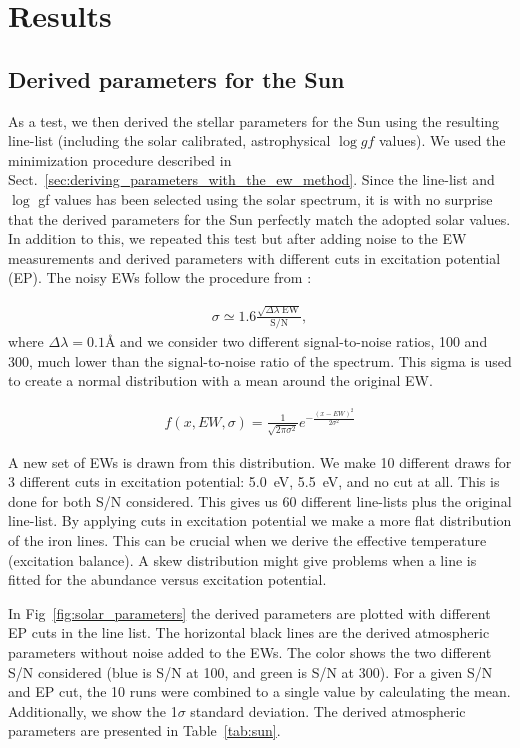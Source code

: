 \documentclass{aa}
\begin{document}
\section{Results}
\label{sec:results}


\subsection{Derived parameters for the Sun}
\label{sec:derived_parameters_of_the_sun}

As a test, we then derived the stellar parameters for the Sun using
the resulting line-list (including the solar calibrated, astrophysical
$\log \mathit{gf}$ values). We used the minimization procedure described
in Sect.~\ref{sec:deriving_parameters_with_the_ew_method}. Since the
line-list and $\log$ gf values has been selected using the solar
spectrum, it is with no surprise that the derived parameters for the
Sun perfectly match the adopted solar values. In addition to this, we
repeated this test but after adding noise to the EW measurements and
derived parameters with different cuts in excitation potential (EP). The
noisy EWs follow the procedure from \cite{Caryel1988}:

\begin{align}
    \sigma \simeq 1.6 \frac{\sqrt{\Delta\lambda\; \mathrm{EW}}}{\mathrm{S/N}},
\end{align}
where $\Delta\lambda=0.1\si{\angstrom}$ and we consider two different
signal-to-noise ratios, 100 and 300, much lower than the signal-to-noise
ratio of the spectrum. This sigma is used to create a normal
distribution with a mean around the original EW.

\begin{align}
    f(x, EW, \sigma) = \frac{1}{\sqrt{2\pi\sigma^2}} e^{-\frac{(x-EW)^2}{2\sigma^2}}
\end{align}

A new set of EWs is drawn from this distribution. We make 10 different
draws for 3 different cuts in excitation potential: \SI{5.0}{eV},
\SI{5.5}{eV}, and no cut at all. This is done for both S/N considered.
This gives us 60 different line-lists plus the original line-list. By
applying cuts in excitation potential we make a more flat distribution
of the iron lines. This can be crucial when we derive the effective
temperature (excitation balance). A skew distribution might give
problems when a line is fitted for the abundance versus excitation
potential.

In Fig~\ref{fig:solar_parameters} the derived parameters are plotted
with different EP cuts in the line list. The horizontal black lines
are the derived atmospheric parameters without noise added to the EWs.
The color shows the two different S/N considered (blue is S/N at 100,
and green is S/N at 300). For a given S/N and EP cut, the 10 runs were
combined to a single value by calculating the mean. Additionally,
we show the 1$\sigma$ standard deviation. The derived atmospheric
parameters are presented in Table~\ref{tab:sun}.
\end{document}
